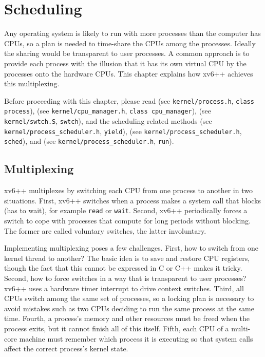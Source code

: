 %
%
\chapter{Scheduling}
\label{CH:SCHED}

Any operating system is likely to run with more processes than the
computer has CPUs, so a plan is needed to time-share the
CPUs among the processes. Ideally the sharing would be transparent to user
processes. A common approach is to provide each process
with the illusion that it has its own virtual CPU by
the processes onto the hardware CPUs.
This chapter explains how xv6++ achieves this multiplexing.

Before proceeding with this chapter, please read
(see \texttt{kernel/process.h}, \texttt{class process}),
(see \texttt{kernel/cpu\_manager.h}, \texttt{class cpu\_manager}),
(see \texttt{kernel/swtch.S}, \texttt{swtch}),
and the scheduling-related methods
(see \texttt{kernel/process\_scheduler.h}, \texttt{yield}),
(see \texttt{kernel/process\_scheduler.h}, \texttt{sched}),
and
(see \texttt{kernel/process\_scheduler.h}, \texttt{run}).

\section{Multiplexing}

xv6++ multiplexes by switching each CPU from one process to
another in two situations. First, xv6++
switches when a process makes a system
call that blocks (has to wait), for example \lstinline{read} or
\lstinline{wait}.
Second, xv6++ periodically forces a switch to cope with
processes that compute for long periods without blocking.
The former are called voluntary switches,
the latter involuntary.

Implementing multiplexing poses a few challenges. First, how to switch from one
kernel thread to another?
The basic idea is to save and restore CPU registers,
though the fact that this cannot be expressed in C or C++ makes it tricky.
Second, how to force
switches in a way that is transparent to user processes?
xv6++ uses a hardware timer interrupt to drive context switches.
Third, all CPUs switch among the same set of processes, so a
locking plan is necessary to avoid mistakes such as two CPUs deciding
to run the same process at the same time.
Fourth, a process's
memory and other resources must be freed when the process exits,
but it cannot finish all of this itself.
Fifth, each CPU of a multi-core machine must remember which
process it is executing so that system calls affect the correct
process's kernel state.


